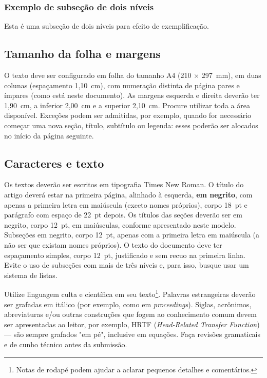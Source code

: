\documentclass[12pt, a4paper, twoside, twocolumn]{article}
\begin{document}
\subsubsection{Exemplo de subseção de dois níveis}

Esta é uma subseção de dois níveis para efeito de exemplificação.

\subsection{Tamanho da folha e margens}

O texto deve ser configurado em folha do tamanho A4 (210 $\times$ 297~mm), em duas colunas (espaçamento 1,10~cm), com numeração distinta de página pares e ímpares (como está neste documento). As margens esquerda e direita deverão ter 1,90~cm, a inferior 2,00~cm e a superior 2,10~cm. Procure utilizar toda a área disponível. Exceções podem ser admitidas, por exemplo, quando for necessário começar uma nova seção, título, subtítulo ou legenda: esses poderão ser alocados no início da página seguinte.

\subsection{Caracteres e texto}

Os textos deverão ser escritos em tipografia Times New Roman. O título do artigo deverá estar na primeira página, alinhado à esquerda, \textbf{em negrito}, com apenas a primeira letra em maiúscula (exceto nomes próprios), corpo 18~pt e parágrafo com espaço de 22~pt depois. Os títulos das seções deverão ser em negrito, corpo 12~pt, em maiúsculas, conforme apresentado neste modelo. Subseções em negrito, corpo 12~pt, apenas com a primeira letra em maiúscula (a não ser que existam nomes próprios). O texto do documento deve ter espaçamento simples, corpo 12~pt, justificado e sem recuo na primeira linha. Evite o uso de subseções com mais de três níveis e, para isso, busque usar um sistema de listas. 


Utilize linguagem culta e científica em seu texto\footnote{Notas de rodapé podem ajudar a aclarar pequenos detalhes e comentários.}. Palavras estrangeiras deverão ser grafadas em itálico (por exemplo, como em \textit{proceedings}). Siglas, acrônimos, abreviaturas e/ou outras construções que fogem ao conhecimento comum devem ser apresentadas ao leitor, por exemplo, HRTF (\textit{Head-Related Transfer Function}) --- são sempre grafados "em pé", inclusive em equações.
Faça revisões gramaticais e de cunho técnico antes da submissão.
\end{document}
